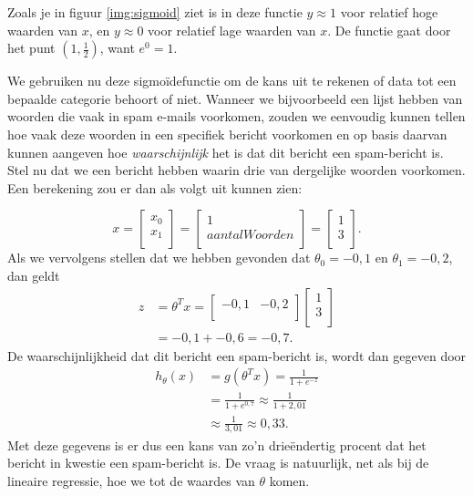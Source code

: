 Zoals je in figuur \ref{img:sigmoid} ziet is in deze functie $y\approx1$ voor relatief hoge waarden van $x$, en $y\approx0$ voor relatief lage waarden van $x$. De functie gaat door het punt $(1,\frac{1}{2})$, want $e^0=1$. 

We gebruiken nu deze sigmoïdefunctie om de kans uit te rekenen of data tot een bepaalde categorie behoort of niet. Wanneer we bijvoorbeeld een lijst hebben van woorden die vaak in spam e-mails voorkomen, zouden we eenvoudig kunnen tellen hoe vaak deze woorden in een specifiek bericht voorkomen en op basis daarvan kunnen aangeven hoe \textit{waarschijnlijk} het is dat dit bericht een spam-bericht is. Stel nu dat we een bericht hebben waarin drie van dergelijke woorden voorkomen. Een berekening zou er dan als volgt uit kunnen zien:

%
\[
x = \begin{bmatrix}
x_0\\
x_1\\
\end{bmatrix}
= \begin{bmatrix}
1\\
aantalWoorden\\
\end{bmatrix}
= \begin{bmatrix}
1\\
3\\
\end{bmatrix}.
\]
%
Als we vervolgens stellen dat we hebben gevonden dat $\theta_0=-0,1$ en $\theta_1=-0,2$, dan geldt 
%
\[
\begin{aligned}
z &= \theta^Tx
= \begin{bmatrix}
-0,1 & -0,2\\
\end{bmatrix}
\begin{bmatrix}
1\\
3\\
\end{bmatrix} \\
&= -0,1 + -0,6 = -0,7.
\end{aligned}
\]
%
De waarschijnlijkheid dat dit bericht een spam-bericht is, wordt dan gegeven door 
%
\[
\begin{aligned}
h_\theta(x) &= g(\theta^Tx) = \frac{1}{1+e^{-z}}\\
&= \frac{1}{1+e^{0,7}}
\approx \frac{1}{1+2,01} \\
&\approx \frac{1}{3,01} \approx 0,33.
\end{aligned}
\]
%
Met deze gegevens is er dus een kans van zo'n drieëndertig procent dat het bericht in kwestie een spam-bericht is. De vraag is natuurlijk, net als bij de lineaire regressie, hoe we tot de waardes van $\theta$ komen.


